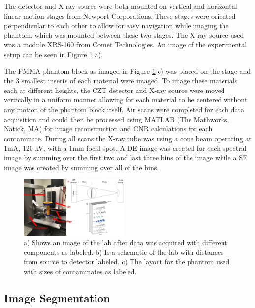 \documentclass[a4paper,11pt]{article}
\begin{document}
The detector and X-ray source were both mounted on vertical and horizontal linear motion stages from Newport Corporations. These stages were oriented perpendicular to each other to allow for easy navigation while imaging the phantom, which was mounted between these two stages. The X-ray source used was a module XRS-160 from Comet Technologies. An image of the experimental setup can be seen in Figure \ref{figure:setup} a). 

The PMMA phantom block as imaged in Figure \ref{figure:setup} c) was placed on the stage and the 3 smallest inserts of each material were imaged. To image these materials each at different heights, the CZT detector and X-ray source were moved vertically in a uniform manner allowing for each material to be centered without any motion of the phantom block itself. Air scans were completed for each data acquisition and could then be processed using MATLAB (The Mathworks, Natick, MA) for image reconstruction and CNR calculations for each contaminate. During all scans the X-ray tube was using a cone beam operating at 1mA, 120 kV, with a 1mm focal spot. A DE image was created for each spectral image by summing over the first two and last three bins of the image while a SE image was created by summing over all of the bins.


\begin{figure}
  
  \begin{center}
    \includegraphics[width=0.48\textwidth]{FullFigure.jpg}
  \end{center}
  
  \caption{a) Shows an image of the lab after data was acquired with different components as labeled. b) Is a schematic of the lab with distances from source to detector labeled. c) The layout for the phantom used with sizes of contaminates as labeled.}
  \label{figure:setup}
\end{figure}

\subsection{Image Segmentation}
\end{document}
